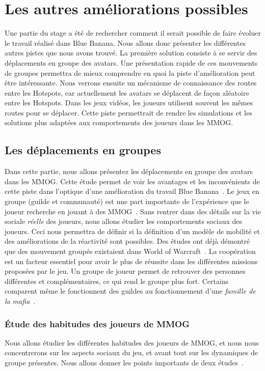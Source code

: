 \newpage
\section{Les autres améliorations possibles}

Une partie du stage a été de rechercher comment il serait possible de faire évoluer le travail réalisé dans Blue Banana. Nous allons donc présenter les différentes autres pistes que nous avons trouvé. La première solution consiste à se servir des déplacements en groupe des avatars. Une présentation rapide de ces mouvements de groupes permettra de mieux comprendre en quoi la piste d'amélioration peut être intéressante. Nous verrons ensuite un mécanisme de connaissance des routes entre les Hotspots, car actuellement les avatars se déplacent de façon aléatoire entre les Hotspots. Dans les jeux vidéos, les joueurs utilisent souvent les mêmes routes pour se déplacer. Cette piste permettrait de rendre les simulations et les solutions plus adaptées aux comportements des joueurs dans les MMOG.

\subsection{Les déplacements en groupes}

Dans cette partie, nous allons présentez les déplacements en groupe des avatars dans les MMOG. Cette étude permet de voir les avantages et les inconvénients de cette piste dans l'optique d'une amélioration du travail Blue Banana~\cite{191}. Le jeux en groupe (guilde et communauté) est une part importante de l'expérience que le joueur recherche en jouant à des MMOG~\cite{1501834,1255052}. Sans rentrer dans des détails sur la vie sociale \textit{réelle} des joueurs, nous allons étudier les comportements sociaux des joueurs. Ceci nous permettra de définir si la définition d'un modèle de mobilité et des améliorations de la réactivité sont possibles. Des études ont déjà démontré que des mouvement groupés existaient dans World of Warcraft~\cite{15141312}. La coopération est un facteur essentiel pour avoir le plus de réussite  dans les différentes missions proposées par le jeu. Un groupe de joueur permet de retrouver des personnes différentes et complémentaires, ce qui rend le groupe plus fort. Certains comparent même le fonctionnent des guildes au fonctionnement d'une \textit{famille de la mafia}~\cite{Jakobsson03thesopranos}.


\subsubsection{Étude des habitudes des joueurs de MMOG}
Nous allons étudier les différentes habitudes des joueurs de MMOG, et nous nous concentrerons sur les aspects sociaux du jeu, et avant tout sur les dynamiques de groupe présentes. Nous allons donner les points importants de deux études~\cite{1255052,StudyEQ}.


